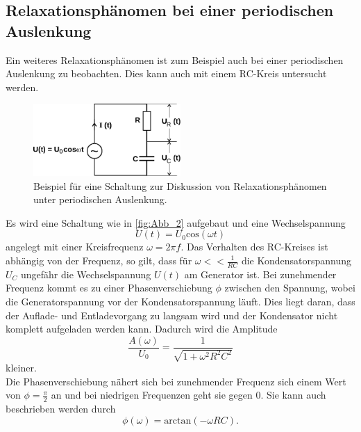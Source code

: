 \subsection{Relaxationsphänomen bei einer periodischen Auslenkung} %
\label{sub:Rela_peri}
Ein weiteres Relaxationsphänomen ist zum Beispiel auch bei einer periodischen Auslenkung zu beobachten. Dies kann auch mit einem RC-Kreis untersucht werden.
\begin{figure}[H]
    \centering
    \includegraphics[width=0.5\textwidth]{build/Abb_2.pdf}
    \caption {Beispiel für eine Schaltung zur Diskussion von Relaxationsphänomen unter periodischen Auslenkung.\cite{v353}}
    \label{fig:Abb_2}
\end{figure}
\noindent Es wird eine Schaltung wie in \autoref{fig:Abb_2} aufgebaut und eine Wechselspannung
\begin{equation}
    U(t) = U_0 \text{cos}(\omega t)
    \label{eqn:Wechselspannung}
\end{equation}
angelegt mit einer Kreisfrequenz $\omega=2\pi f$.
Das Verhalten des RC-Kreises ist abhängig von der Frequenz, so gilt, dass für $\omega << \frac{1}{RC}$ die Kondensatorspannung $U_C$ ungefähr die Wechselspannung $U(t)$ am Generator ist.
Bei zunehmender Frequenz kommt es zu einer Phasenverschiebung $\phi$ zwischen den Spannung, wobei die Generatorspannung vor der Kondensatorspannung läuft.
Dies liegt daran, dass der Auflade- und Entladevorgang zu langsam wird und der Kondensator nicht komplett aufgeladen werden kann. 
Dadurch wird die Amplitude
\begin{equation}
    \frac{A(\omega)}{U_0} = \frac{1}{\sqrt{1+\omega^2R^2C^2}}
    \label{eqn:Amplitude}
\end{equation}
kleiner.\\
\noindent Die Phasenverschiebung nähert sich bei zunehmender Frequenz sich einem Wert von $\phi =\frac{\pi}{2}$ an und bei niedrigen Frequenzen geht sie gegen $0$.
Sie kann auch beschrieben werden durch
\begin{equation}
    \phi(\omega) = \text{arctan}(-\omega RC).
\end{equation}

